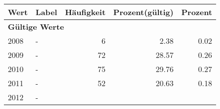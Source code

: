      \begin{longtable}{lXrrr}
     \toprule
     \textbf{Wert} & \textbf{Label} & \textbf{Häufigkeit} & \textbf{Prozent(gültig)} & \textbf{Prozent} \\
     \endhead
     \midrule
     \multicolumn{5}{l}{\textbf{Gültige Werte}}\\

     2008 &
     \multicolumn{1}{X}{ -  } &


       \num{6} &
       \num[round-mode=places,round-precision=2]{2.38} &
         \num[round-mode=places,round-precision=2]{0.02} \\

     2009 &
     \multicolumn{1}{X}{ -  } &


       \num{72} &
       \num[round-mode=places,round-precision=2]{28.57} &
         \num[round-mode=places,round-precision=2]{0.26} \\

     2010 &
     \multicolumn{1}{X}{ -  } &


       \num{75} &
       \num[round-mode=places,round-precision=2]{29.76} &
         \num[round-mode=places,round-precision=2]{0.27} \\

     2011 &
     \multicolumn{1}{X}{ -  } &


       \num{52} &
       \num[round-mode=places,round-precision=2]{20.63} &
         \num[round-mode=places,round-precision=2]{0.18} \\

     2012 &
     \multicolumn{1}{X}{ -  } &



\end{longtable}
